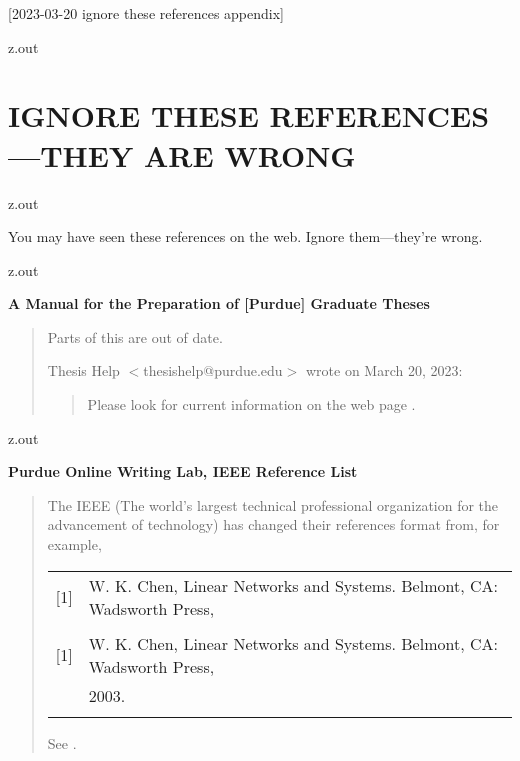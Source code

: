 [2023-03-20 ignore these references appendix]

\begin{VerbatimOut}{z.out}
\chapter{IGNORE THESE REFERENCES---THEY ARE WRONG}
\end{VerbatimOut}

\MyIO


\begin{VerbatimOut}{z.out}

You may have seen these references on the web.
Ignore them---they're wrong.
\end{VerbatimOut}

\MyIO


\begin{VerbatimOut}{z.out}

\noindent
\textbf{A Manual for the Preparation of [Purdue] Graduate Theses}
\cite{thesis2017}

\begin{quote}
  Parts of this are out of date.

  Thesis Help \(<\)thesishelp@purdue.edu\(>\) wrote on March 20, 2023:
  \begin{quote}
    Please look for current information on the
    web page
    \cite{thesisanddissertationofficeb}.
  \end{quote}
\end{quote}
\end{VerbatimOut}

\MyIO


\begin{VerbatimOut}{z.out}

\noindent
\textbf{Purdue Online Writing Lab, IEEE Reference List}
\cite{owl}
  
\begin{quote}
  The IEEE
  (The world's largest technical professional organization
  for the advancement
  of technology)
  has changed their references format from,
  for example,
  
  \noindent
  \begin{tabular}{@{}ll@{}}
  \noalign{\vspace*{6pt}}
    [1]& W. K. Chen, Linear Networks and Systems. Belmont, CA: Wadsworth Press,\\
    \multispan{2}{2003.\hfil}\\
  \noalign{\vspace*{6pt}}
  \noalign{\noindent to}
  \noalign{\vspace*{6pt}}
    [1]& W. K. Chen, Linear Networks and Systems. Belmont, CA: Wadsworth Press,\\
    & 2003.\hfil\\
  \noalign{\vspace*{6pt}}
  \end{tabular}
  See
  \cite[page~2]{ieeedataport}.
\end{quote}
\end{VerbatimOut}

